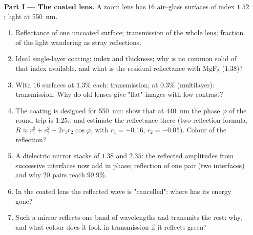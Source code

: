 \begin{problem}
\label{pb:b2:wave-interfaces:1}

\medskip
\noindent\textbf{Part I --- The coated lens.}
A zoom lens has $16$ air--glass surfaces of index $1.52$; light at
\qty{550}{nm}.
\begin{enumerate}
  \item Reflectance of one uncoated surface; transmission of the whole
        lens; fraction of the light wandering as stray reflections.
  \item Ideal single-layer coating: index and thickness; why is no
        common solid of that index available, and what is the
        residual reflectance with MgF$_2$ ($1.38$)?
  \item With $16$ surfaces at $1.3\%$ each: transmission; at $0.3\%$
        (multilayer): transmission. Why do old lenses give "flat" images
        with low contrast?
  \item The coating is designed for \qty{550}{nm}: show that at
        \qty{440}{nm} the phase $\varphi$ of the round trip is $1.25\pi$ and
        estimate the reflectance there (two-reflection formula, $R
        \approx r_1^2 + r_2^2 + 2r_1r_2\cos\varphi$, with $r_1 = -0.16$, $r_2 =
        -0.05$). Colour of the reflection?
  \item A dielectric mirror stacks  of $1.38$ and
        $2.35$: the reflected amplitudes from successive interfaces
        now add in phase; reflection of one pair (two interfaces) and
        why $20$ pairs reach $99.9\%$.
  \item In the coated lens the reflected wave is "cancelled": where
        has its energy gone?
  \item Such a mirror reflects one band of wavelengths and transmits
        the rest: why, and what colour does it look in transmission
        if it reflects green?
\end{enumerate}


\end{problem}
